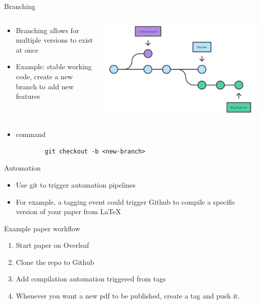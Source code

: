 \documentclass[t]{beamer}
\begin{document}
\begin{frame}[fragile]{Branching}

  \begin{columns}[T]
    \begin{column}{.5\textwidth}
     \begin{block}{}
     \begin{itemize}
         \item Branching allows for multiple versions to exist at once
         \item Example: stable working code, create a new branch to add new features

     \end{itemize}
    \end{block}
    \end{column}
    \begin{column}{.5\textwidth}
    \begin{block}{}
    \includegraphics[width = \textwidth]{branches.png}
    \end{block}
    \end{column}
  \end{columns}
 
 \begin{itemize}
          \item command
         \begin{verbatim}
        git checkout -b <new-branch>
         \end{verbatim}
\end{itemize}
    
\end{frame}

\begin{frame}{Automation}
\begin{itemize}
    \item Use git to trigger automation pipelines
    \item For example, a tagging event could trigger Github to compile a specific version of your paper from \LaTeX
\end{itemize}

\end{frame}
    

\begin{frame}{Example paper workflow}
\begin{enumerate}
    \item Start paper on Overleaf
    \item Clone the repo to Github
    \item Add compilation automation triggered from tags
    \item Whenever you want a new pdf to be published, create a tag and push it. 
\end{enumerate}
    
\end{frame}
\end{document}
